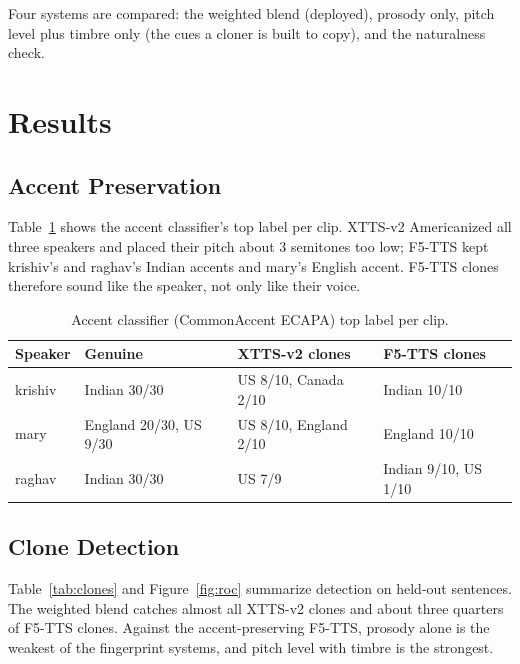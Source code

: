 \documentclass[11pt,a4paper]{article}
\begin{document}
Four systems are compared: the weighted blend (deployed), prosody only, pitch level plus timbre only (the cues a cloner is built to copy), and the naturalness check.

\section{Results}
\label{sec:results}

\subsection{Accent Preservation}
Table~\ref{tab:accent} shows the accent classifier's top label per clip. XTTS-v2 Americanized all three speakers and placed their pitch about 3 semitones too low; F5-TTS kept krishiv's and raghav's Indian accents and mary's English accent. F5-TTS clones therefore sound like the speaker, not only like their voice.

\begin{table}[h]
\centering\small
\begin{tabular}{@{}llll@{}}
\toprule
Speaker & Genuine & XTTS-v2 clones & F5-TTS clones\\
\midrule
krishiv & Indian 30/30 & US 8/10, Canada 2/10 & Indian 10/10\\
mary & England 20/30, US 9/30 & US 8/10, England 2/10 & England 10/10\\
raghav & Indian 30/30 & US 7/9 & Indian 9/10, US 1/10\\
\bottomrule
\end{tabular}
\caption{Accent classifier (CommonAccent ECAPA) top label per clip.}
\label{tab:accent}
\end{table}

\subsection{Clone Detection}
Table~\ref{tab:clones} and Figure~\ref{fig:roc} summarize detection on held-out sentences. The weighted blend catches almost all XTTS-v2 clones and about three quarters of F5-TTS clones. Against the accent-preserving F5-TTS, prosody alone is the weakest of the fingerprint systems, and pitch level with timbre is the strongest.
\end{document}
